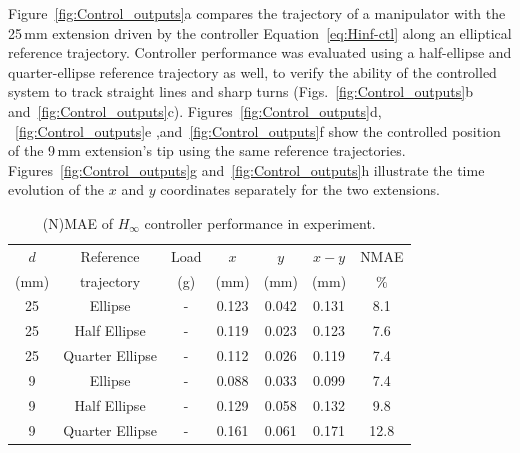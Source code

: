 Figure~\ref{fig:Control_outputs}a compares the trajectory of a manipulator with the 25\,mm extension driven by the controller Equation~\eqref{eq:Hinf-ctl} along an elliptical reference trajectory. Controller performance was evaluated using a half-ellipse and quarter-ellipse reference trajectory as well, to verify the ability of the controlled system to track straight lines and sharp turns (Figs.~\ref{fig:Control_outputs}b and~\ref{fig:Control_outputs}c). Figures~\ref{fig:Control_outputs}d, ~\ref{fig:Control_outputs}e ,and~\ref{fig:Control_outputs}f show the controlled position of the 9\,mm extension's tip using the same reference trajectories. Figures~\ref{fig:Control_outputs}g and~\ref{fig:Control_outputs}h illustrate the time evolution of the $x$ and $y$ coordinates separately for the two extensions.

\begin{table}[t]
\centering
\caption{(N)MAE of $H_{\infty}$ controller performance in experiment.}\vspace{-0.25cm}
\begin{tabular}{c c c c c c c}
\hline
\hspace{-2mm} $d$ & Reference & Load & $x$ & $y$ & $x-y$ & \hspace{-2mm} NMAE\\
\hspace{-2mm} (mm) &  trajectory   & (g)  & (mm)& (mm)& (mm) & \hspace{-2mm}$\%$\\
\hline
\hspace{-2mm}25 & Ellipse          & - & 0.123 & 0.042 & 0.131 & \hspace{-2mm}8.1\\
\hspace{-2mm}25 & Half Ellipse     & - & 0.119 & 0.023 & 0.123 & \hspace{-2mm}7.6\\
\hspace{-2mm}25 & Quarter Ellipse  & - & 0.112 & 0.026 & 0.119 & \hspace{-2mm}7.4\\
\hspace{-2mm}9 & Ellipse           & - & 0.088 & 0.033 & 0.099 & \hspace{-2mm}7.4\\
\hspace{-2mm}9 & Half Ellipse      & - & 0.129 & 0.058 & 0.132 & \hspace{-2mm}9.8\\
\hspace{-2mm}9 & Quarter Ellipse   & - & 0.161 & 0.061 & 0.171 & \hspace{-2mm}12.8\\

\end{tabular}
\end{table}
